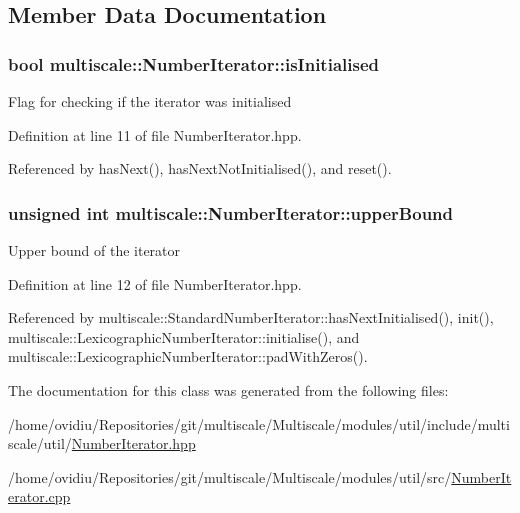 \subsection{Member Data Documentation}
\hypertarget{classmultiscale_1_1NumberIterator_ae3d929444e14677de0b616a059380f3f}{
\subsubsection[{is\-Initialised}]{\setlength{\rightskip}{0pt plus 5cm}bool multiscale\-::\-Number\-Iterator\-::is\-Initialised\hspace{0.3cm}{\ttfamily [protected]}}}\label{classmultiscale_1_1NumberIterator_ae3d929444e14677de0b616a059380f3f}
Flag for checking if the iterator was initialised 

Definition at line 11 of file Number\-Iterator.\-hpp.



Referenced by has\-Next(), has\-Next\-Not\-Initialised(), and reset().

\hypertarget{classmultiscale_1_1NumberIterator_a56a5558958778bbde64e249d67cba886}{
\subsubsection[{upper\-Bound}]{\setlength{\rightskip}{0pt plus 5cm}unsigned int multiscale\-::\-Number\-Iterator\-::upper\-Bound\hspace{0.3cm}{\ttfamily [protected]}}}\label{classmultiscale_1_1NumberIterator_a56a5558958778bbde64e249d67cba886}
Upper bound of the iterator 

Definition at line 12 of file Number\-Iterator.\-hpp.



Referenced by multiscale\-::\-Standard\-Number\-Iterator\-::has\-Next\-Initialised(), init(), multiscale\-::\-Lexicographic\-Number\-Iterator\-::initialise(), and multiscale\-::\-Lexicographic\-Number\-Iterator\-::pad\-With\-Zeros().



The documentation for this class was generated from the following files\-:\begin{DoxyCompactItemize}
\item 
/home/ovidiu/\-Repositories/git/multiscale/\-Multiscale/modules/util/include/multiscale/util/\hyperlink{NumberIterator_8hpp}{Number\-Iterator.\-hpp}\item 
/home/ovidiu/\-Repositories/git/multiscale/\-Multiscale/modules/util/src/\hyperlink{NumberIterator_8cpp}{Number\-Iterator.\-cpp}\end{DoxyCompactItemize}
